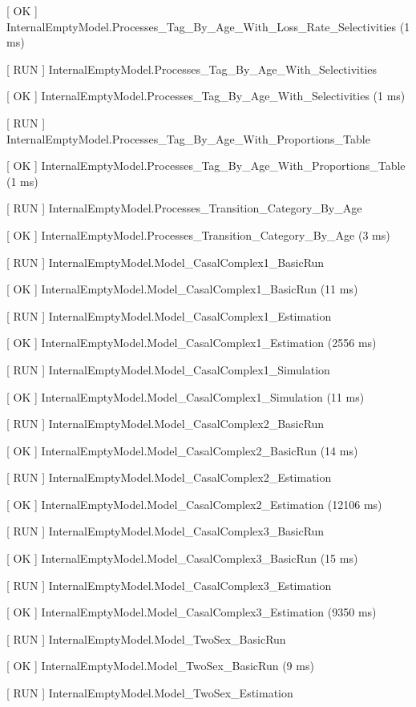 \documentclass[a4paper,11pt,twoside,pdftex,draft]{article}
\begin{document}
{[} OK {]}
InternalEmptyModel.Processes\_Tag\_By\_Age\_With\_Loss\_Rate\_Selectivities
(1 ms)

{[} RUN {]}
InternalEmptyModel.Processes\_Tag\_By\_Age\_With\_Selectivities

{[} OK {]}
InternalEmptyModel.Processes\_Tag\_By\_Age\_With\_Selectivities (1 ms)

{[} RUN {]}
InternalEmptyModel.Processes\_Tag\_By\_Age\_With\_Proportions\_Table

{[} OK {]}
InternalEmptyModel.Processes\_Tag\_By\_Age\_With\_Proportions\_Table (1
ms)

{[} RUN {]} InternalEmptyModel.Processes\_Transition\_Category\_By\_Age

{[} OK {]} InternalEmptyModel.Processes\_Transition\_Category\_By\_Age
(3 ms)

{[} RUN {]} InternalEmptyModel.Model\_CasalComplex1\_BasicRun

{[} OK {]} InternalEmptyModel.Model\_CasalComplex1\_BasicRun (11 ms)

{[} RUN {]} InternalEmptyModel.Model\_CasalComplex1\_Estimation

{[} OK {]} InternalEmptyModel.Model\_CasalComplex1\_Estimation (2556 ms)

{[} RUN {]} InternalEmptyModel.Model\_CasalComplex1\_Simulation

{[} OK {]} InternalEmptyModel.Model\_CasalComplex1\_Simulation (11 ms)

{[} RUN {]} InternalEmptyModel.Model\_CasalComplex2\_BasicRun

{[} OK {]} InternalEmptyModel.Model\_CasalComplex2\_BasicRun (14 ms)

{[} RUN {]} InternalEmptyModel.Model\_CasalComplex2\_Estimation

{[} OK {]} InternalEmptyModel.Model\_CasalComplex2\_Estimation (12106
ms)

{[} RUN {]} InternalEmptyModel.Model\_CasalComplex3\_BasicRun

{[} OK {]} InternalEmptyModel.Model\_CasalComplex3\_BasicRun (15 ms)

{[} RUN {]} InternalEmptyModel.Model\_CasalComplex3\_Estimation

{[} OK {]} InternalEmptyModel.Model\_CasalComplex3\_Estimation (9350 ms)

{[} RUN {]} InternalEmptyModel.Model\_TwoSex\_BasicRun

{[} OK {]} InternalEmptyModel.Model\_TwoSex\_BasicRun (9 ms)

{[} RUN {]} InternalEmptyModel.Model\_TwoSex\_Estimation
\end{document}
